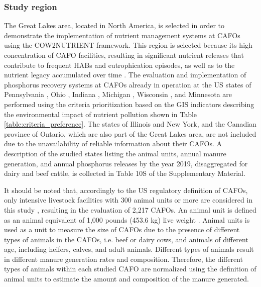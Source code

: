 \documentclass[authoryear]{elsarticle}
\begin{document}
\subsubsection{Study region}
The Great Lakes area, located in North America, is selected in order to demonstrate the implementation of nutrient management systems at CAFOs using the COW2NUTRIENT framework. This region is selected because its high concentration of CAFO facilities, resulting in significant nutrient releases that contribute to frequent HABs and eutrophication episodes,
as well as to the nutrient legacy accumulated over time \citep{sayers2019satellite, han2012historical}. The evaluation and implementation of phosphorus recovery systems at CAFOs already in operation at the US states of Pennsylvania \citep{Pennsylvania_CAFOS}, Ohio \citep{Ohio_CAFOS}, Indiana \citep{Indiana_CAFOS}, Michigan \citep{Michigan_CAFOS}, Wisconsin \citep{Wisconsin_CAFOS}, and Minnesota \citep{Minnesota_CAFOS} are performed using the criteria prioritization based on the GIS indicators describing 
the environmental impact of nutrient pollution shown
in Table \ref{table:criteria_preference}. The states of Illinois and New York, and the Canadian province of Ontario, which are also part of the Great Lakes area, are not included due to the unavailability of reliable information about their CAFOs. A description of the studied states listing the animal units, annual manure generation, and annual phosphorus releases by the year 2019, disaggregated for dairy and beef cattle, is collected in Table 10S of the Supplementary Material. 

It should be noted that, accordingly to the US regulatory definition of CAFOs, only intensive livestock facilities with 300 animal units or more are considered in this study \citep{CAFO_definition}, resulting in the evaluation of 2,217 CAFOs. An animal unit is defined as an animal equivalent of 1,000 pounds (453.6 kg) live weight \citep{animal_unit_definition}. Animal units is used as a unit to measure the size of CAFOs due to the presence of different types of animals in the CAFOs, i.e. beef or dairy cows, and animals of different age, including heifers, calves, and adult animals. Different types of animals result in different manure generation rates and composition. Therefore, the different types of animals within each studied CAFO are normalized using the definition of animal units to estimate the amount and composition of the manure generated.
\end{document}
